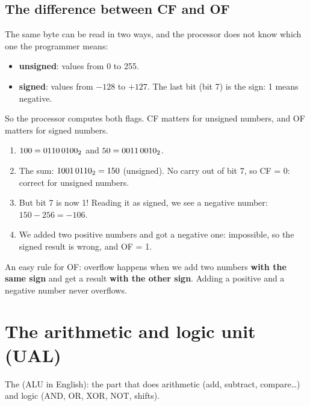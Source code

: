 \subsection{The difference between CF and OF}
The same byte can be read in two ways, and the processor does not know which one the programmer means:
\begin{itemize}
    \item \textbf{unsigned}: values from 0 to 255.
    \item \textbf{signed}: values from $-128$ to $+127$. The last bit (bit 7) is the sign: 1 means negative.
\end{itemize}
So the processor computes both flags. CF matters for unsigned numbers, and OF matters for signed numbers.

\begin{khatwa}[: $100 + 50$ on 8 bits]
    \begin{enumerate}
        \item $100 = \mbox{0110\,0100\textsubscript{2}}$ and $50 = \mbox{0011\,0010\textsubscript{2}}$.
        \item The sum: $\mbox{1001\,0110\textsubscript{2}} = 150$ (unsigned). No carry out of bit 7, so CF = 0: correct for unsigned numbers.
        \item But bit 7 is now 1! Reading it as signed, we see a negative number: $150 - 256 = -106$.
        \item We added two positive numbers and got a negative one: impossible, so the signed result is wrong, and OF = 1.
    \end{enumerate}
\end{khatwa}

\begin{intabih}
    An easy rule for OF: overflow happens when we add two numbers \textbf{with the same sign} and get a result
    \textbf{with the other sign}. Adding a positive and a negative number never overflows.
\end{intabih}

\section{The arithmetic and logic unit (UAL)}

\begin{tarif}
    The  (ALU in English): the part
    that does arithmetic (add, subtract, compare\dots) and logic (AND, OR, XOR, NOT, shifts).
\end{tarif}

